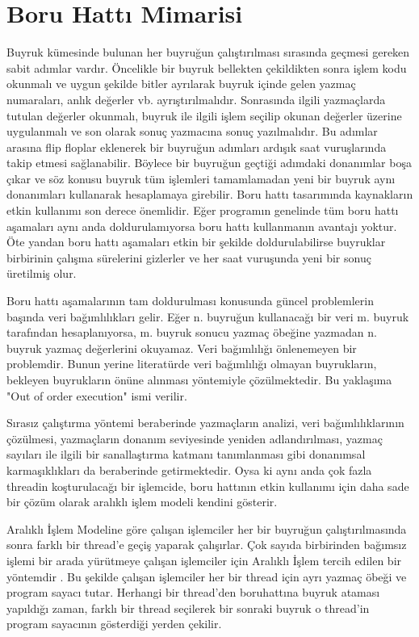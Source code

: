 \section{Boru Hattı Mimarisi}
Buyruk kümesinde bulunan her buyruğun çalıştırılması sırasında geçmesi gereken sabit adımlar vardır. Öncelikle bir buyruk bellekten çekildikten sonra işlem kodu okunmalı ve uygun şekilde bitler ayrılarak buyruk içinde gelen yazmaç numaraları, anlık değerler vb. ayrıştırılmalıdır. Sonrasında ilgili yazmaçlarda tutulan değerler okunmalı, buyruk ile ilgili işlem seçilip okunan değerler üzerine uygulanmalı ve son olarak sonuç yazmacına sonuç yazılmalıdır. Bu adımlar arasına flip floplar eklenerek bir buyruğun adımları ardışık saat vuruşlarında takip etmesi sağlanabilir. Böylece bir buyruğun geçtiği adımdaki donanımlar boşa çıkar ve söz konusu buyruk tüm işlemleri tamamlamadan yeni bir buyruk aynı donanımları kullanarak hesaplamaya girebilir. Boru hattı tasarımında kaynakların etkin kullanımı son derece önemlidir. Eğer programın genelinde tüm boru hattı aşamaları aynı anda doldurulamıyorsa boru hattı kullanmanın avantajı yoktur. Öte yandan boru hattı aşamaları etkin bir şekilde doldurulabilirse buyruklar birbirinin çalışma sürelerini gizlerler ve her saat vuruşunda yeni bir sonuç üretilmiş olur.   \par

Boru hattı aşamalarının tam doldurulması konusunda güncel problemlerin başında veri bağımlılıkları gelir. Eğer n. buyruğun kullanacağı bir veri m. buyruk tarafından hesaplanıyorsa, m. buyruk sonucu yazmaç öbeğine yazmadan n. buyruk yazmaç değerlerini okuyamaz. Veri bağımlılığı önlenemeyen bir problemdir. Bunun yerine literatürde veri bağımlılığı olmayan buyrukların, bekleyen buyrukların önüne alınması yöntemiyle çözülmektedir. Bu yaklaşıma "Out of order execution" ismi verilir. \cite{superscalar600mhz} \cite{superscalarpatent}\par

Sırasız çalıştırma yöntemi beraberinde yazmaçların analizi, veri bağımlılıklarının çözülmesi, yazmaçların donanım seviyesinde yeniden adlandırılması, yazmaç sayıları ile ilgili bir sanallaştırma katmanı tanımlanması gibi donanımsal karmaşıklıkları da beraberinde getirmektedir. Oysa ki aynı anda çok fazla threadin koşturulacağı bir işlemcide, boru hattının etkin kullanımı için daha sade bir çözüm olarak aralıklı işlem modeli kendini gösterir. \cite{interleavedMultithreading} 

Aralıklı İşlem Modeline göre çalışan işlemciler her bir buyruğun çalıştırılmasında sonra farklı bir thread’e geçiş yaparak çalışırlar. Çok sayıda birbirinden bağımsız işlemi bir arada yürütmeye çalışan işlemciler için Aralıklı İşlem tercih edilen bir yöntemdir \cite{Controldatacorp} \cite{TeraMTA}. Bu şekilde çalışan işlemciler her bir thread için ayrı yazmaç öbeği ve program sayacı tutar. Herhangi bir thread’den boruhattına buyruk ataması yapıldığı zaman, farklı bir thread seçilerek bir sonraki buyruk o thread’in program sayacının gösterdiği yerden çekilir.\par

